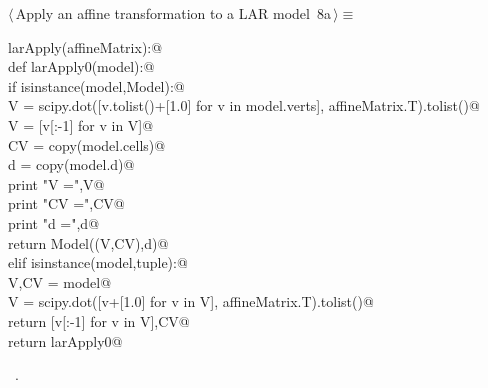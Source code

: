 \documentclass[11pt,oneside]{article}	%
\begin{document}
\begin{flushleft} \small \label{scrap16}
\protect{}$\langle\,$Apply an affine transformation to a LAR model\nobreak\ {\footnotesize 8a}$\,\rangle\equiv$
\vspace{-1ex}
\begin{list}{}{} \item
\mbox{}\verb@def larApply(affineMatrix):@\\
\mbox{}\verb@   def larApply0(model):@\\
\mbox{}\verb@      if isinstance(model,Model):@\\
\mbox{}\verb@         V = scipy.dot([v.tolist()+[1.0] for v in model.verts], affineMatrix.T).tolist()@\\
\mbox{}\verb@         V = [v[:-1] for v in V]@\\
\mbox{}\verb@         CV = copy(model.cells)@\\
\mbox{}\verb@         d = copy(model.d)@\\
\mbox{}\verb@         print "\n V =",V@\\
\mbox{}\verb@         print "\n CV =",CV@\\
\mbox{}\verb@         print "\n d =",d@\\
\mbox{}\verb@         return Model((V,CV),d)@\\
\mbox{}\verb@      elif isinstance(model,tuple):@\\
\mbox{}\verb@         V,CV = model@\\
\mbox{}\verb@         V = scipy.dot([v+[1.0] for v in V], affineMatrix.T).tolist()@\\
\mbox{}\verb@         return [v[:-1] for v in V],CV@\\
\mbox{}\verb@   return larApply0@\\
\mbox{}\verb@@{\NWsep}
\end{list}
\vspace{-1ex}
\footnotesize\addtolength{\baselineskip}{-1ex}
\begin{list}{}{\setlength{\itemsep}{-\parsep}\setlength{\itemindent}{-\leftmargin}}
\item \NWtxtMacroRefIn\ .
\end{list}
\end{flushleft}
\end{document}
